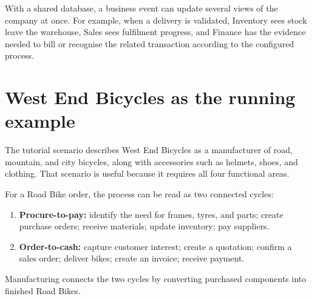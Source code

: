 \begin{erpfigure}
\end{erpfigure}

With a shared database, a business event can update several views of the company at once. For example, when a delivery is validated, Inventory sees stock leave the warehouse, Sales sees fulfilment progress, and Finance has the evidence needed to bill or recognise the related transaction according to the configured process.

\section{West End Bicycles as the running example}

The tutorial scenario describes West End Bicycles as a manufacturer of road, mountain, and city bicycles, along with accessories such as helmets, shoes, and clothing. That scenario is useful because it requires all four functional areas.

\begin{workedexample}
For a Road Bike order, the process can be read as two connected cycles:
\begin{enumerate}
  \item \textbf{Procure-to-pay:} identify the need for frames, tyres, and parts; create purchase orders; receive materials; update inventory; pay suppliers.
  \item \textbf{Order-to-cash:} capture customer interest; create a quotation; confirm a sales order; deliver bikes; create an invoice; receive payment.
\end{enumerate}
Manufacturing connects the two cycles by converting purchased components into finished Road Bikes.
\end{workedexample}

